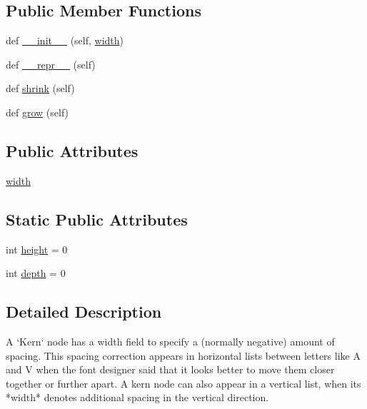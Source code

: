 \subsection*{Public Member Functions}
\begin{DoxyCompactItemize}
\item 
def \hyperlink{classmatplotlib_1_1__mathtext_1_1Kern_a51b27a8be74fd92bdbf4b8a1116f2418}{\+\_\+\+\_\+init\+\_\+\+\_\+} (self, \hyperlink{classmatplotlib_1_1__mathtext_1_1Kern_a89837c719a9b088046b1f61c0ad489cf}{width})
\item 
def \hyperlink{classmatplotlib_1_1__mathtext_1_1Kern_ae21ceb4385917f831d5913b6bf8b1603}{\+\_\+\+\_\+repr\+\_\+\+\_\+} (self)
\item 
def \hyperlink{classmatplotlib_1_1__mathtext_1_1Kern_a267dfd0c87f2173b1cad1aab1aff20fa}{shrink} (self)
\item 
def \hyperlink{classmatplotlib_1_1__mathtext_1_1Kern_a77d1f0e4868ba7cf759d9519aff0c346}{grow} (self)
\end{DoxyCompactItemize}
\subsection*{Public Attributes}
\begin{DoxyCompactItemize}
\item 
\hyperlink{classmatplotlib_1_1__mathtext_1_1Kern_a89837c719a9b088046b1f61c0ad489cf}{width}
\end{DoxyCompactItemize}
\subsection*{Static Public Attributes}
\begin{DoxyCompactItemize}
\item 
int \hyperlink{classmatplotlib_1_1__mathtext_1_1Kern_a0cec03ceff7ce36d79416429d47e24fe}{height} = 0
\item 
int \hyperlink{classmatplotlib_1_1__mathtext_1_1Kern_a60454934bd946e6be825ff494f5be435}{depth} = 0
\end{DoxyCompactItemize}


\subsection{Detailed Description}
\begin{DoxyVerb}A `Kern` node has a width field to specify a (normally
negative) amount of spacing. This spacing correction appears in
horizontal lists between letters like A and V when the font
designer said that it looks better to move them closer together or
further apart. A kern node can also appear in a vertical list,
when its *width* denotes additional spacing in the vertical
direction.
\end{DoxyVerb}
 

